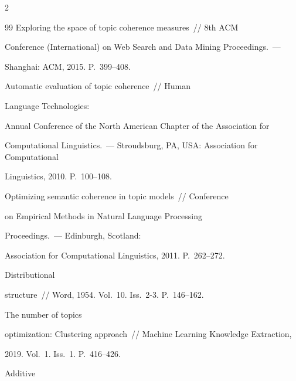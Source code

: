 \begin{multicols}{2}
{{\begin{thebibliography}{99}
Exploring the space of topic coherence measures~// 8th ACM 


 Conference (International) on Web Search and Data Mining Proceedings.~--- 


Shanghai: ACM, 2015.  P.~399--408.









Automatic evaluation of topic coherence~// Human 


Language Technologies:  


Annual Conference of the North American Chapter of the Association for 


Computational Linguistics.~--- Stroudsburg, PA, USA: Association for Computational 


Linguistics, 2010. P.~100--108.









Optimizing semantic coherence in topic models~// Conference 


on Empirical Methods in Natural Language Processing


Proceedings.~--- Edinburgh, Scotland: 


Association for Computational Linguistics, 2011. P.~262--272.







  Distributional 


structure~// Word, 1954. Vol.~10. Iss.~2-3. P.~146--162.







 The number of topics 


optimization: Clustering approach~// Machine Learning Knowledge Extraction, 


2019. Vol.~1. Iss.~1. P.~416--426.







 Additive 



\end{thebibliography}}}
\end{multicols}
